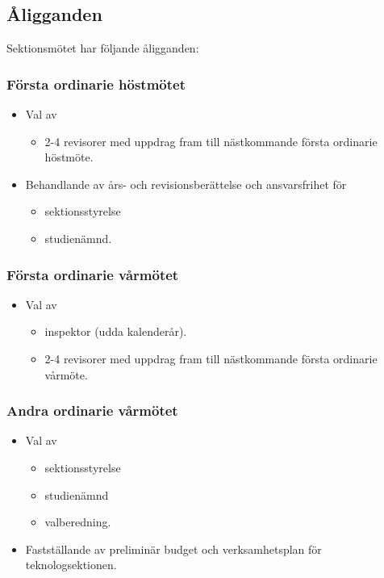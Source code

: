 \subsection{Åligganden}
Sektionsmötet har följande åligganden:
\subsubsection{Första ordinarie höstmötet}
\begin{itemize}
	\item Val av 
	\begin{itemize}
        \item 2-4 revisorer med uppdrag fram till nästkommande första ordinarie höstmöte.
	\end{itemize}
	\item Behandlande av års- och revisionsberättelse och ansvarsfrihet för 
	\begin{itemize}
		\item sektionsstyrelse
		\item studienämnd.
	\end{itemize}
\end{itemize}
	
\subsubsection{Första ordinarie vårmötet}
\begin{itemize}
	\item Val av 
	\begin{itemize}
		\item inspektor (udda kalenderår).
	    \item 2-4 revisorer med uppdrag fram till nästkommande första ordinarie vårmöte.
	\end{itemize}
\end{itemize}


\subsubsection{Andra ordinarie vårmötet}
\begin{itemize}
	\item Val av 
	\begin{itemize}
		\item sektionsstyrelse
		\item studienämnd 		
		\item valberedning.
	\end{itemize}
	\item Fastställande av preliminär budget och verksamhetsplan för teknologsektionen.
\end{itemize}

